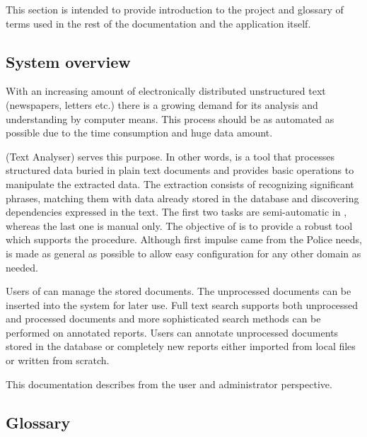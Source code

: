 

This section is intended to provide introduction to the project and glossary of
terms used in the rest of the documentation and the application itself.

\subsection{System overview}

With an increasing amount of electronically distributed unstructured text
(newspapers, letters etc.) there is a growing demand for its analysis and
understanding by computer means. This process should be as automated as possible
due to the time consumption and huge data amount.

\textan{} (Text Analyser) serves this purpose. In other words, \textan{} is a
tool that processes structured data buried in plain text documents and provides
basic operations to manipulate the extracted data. The extraction consists of
recognizing significant phrases, matching them with data already stored in the
database and discovering dependencies expressed in the text. The first two tasks
are semi-automatic in \textan{}, whereas the last one is manual only. The
objective of \textan{} is to provide a robust tool which supports the procedure.
Although first impulse came from the Police needs, \textan{} is made as general as
possible to allow easy configuration for any other domain as needed.

Users of \textan{} can manage the stored documents. The unprocessed documents can
be inserted into the system for later use. Full text search supports both
unprocessed and processed documents and more sophisticated search methods can be
performed on annotated reports. Users can annotate unprocessed documents stored in
the database or completely new reports either imported from local files or written
from scratch.

This documentation describes \textan{} from the user and administrator
perspective.

\subsection{Glossary}

